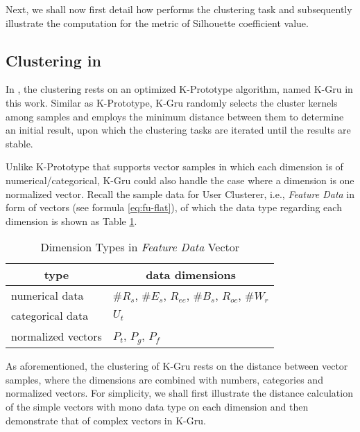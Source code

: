 Next, we shall now first detail how \sys{} performs the clustering task and subsequently illustrate the computation for the metric of Silhouette coefficient value.

\subsection{Clustering in \sys{}}
\label{sec:cluster}

In \sys{}, the clustering rests on an optimized K-Prototype \cite{IEEEexample:huang1997clustering} algorithm, named K-Gru in this work.
Similar as K-Prototype, K-Gru randomly selects the cluster kernels among samples and employs the minimum distance between them to determine an initial result, upon which the clustering tasks are iterated until the results are stable.

Unlike K-Prototype that supports vector samples in which each dimension is of numerical/categorical, K-Gru could also handle the case where a dimension is one normalized vector.
%
Recall the sample data for User Clusterer, i.e., \textit{Feature Data} in form of vectors (see formula \ref{eq:fu-flat}), of which the data type regarding each dimension is shown as Table \ref{tbl:data-type}.

\begin{table}[!htb]
\centering
\begin{small}
\caption{Dimension Types in \textit{Feature Data} Vector}
\vspace{0.3cm}
\label{tbl:data-type}
\begin{tabular}{ll}
\toprule
\multicolumn{1}{c}{\textbf{type}} & \multicolumn{1}{c}{\textbf{data dimensions}}	\\	\midrule \midrule
numerical data				& $\#R_s$, $\#E_s$, $R_{ee}$, $\#B_s$, $R_{oc}$, $\#W_r$				\\	\midrule
categorical data			& $U_t$				\\	\midrule
normalized vectors			& $P_t$, $P_g$, $P_f$			\\ \bottomrule
\end{tabular}
\end{small}
\end{table}

As aforementioned, the clustering of K-Gru rests on the distance between vector samples, where the dimensions are combined with numbers, categories and normalized vectors.
For simplicity, we shall first illustrate the distance calculation of the simple vectors with mono data type on each dimension and then demonstrate that of complex vectors in K-Gru.


